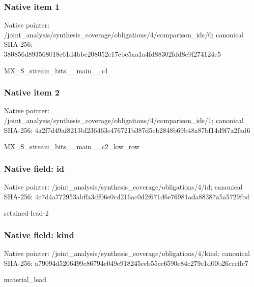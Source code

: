 \documentclass[10pt,a4paper]{article}
\begin{document}
\subsubsection{Native item 1}
Native pointer: /joint\_\allowbreak{}analysis/synthesis\_\allowbreak{}coverage/obligations/4/comparison\_\allowbreak{}ids/0; canonical SHA-256: 380856d893568018c61d4bbc208052c17ebe5aa1a4fd88302fdd8e9f274124c5

\begingroup\raggedright\sloppy MX\_\allowbreak{}S\_\allowbreak{}stream\_\allowbreak{}bits\_\allowbreak{}\_\allowbreak{}main\_\allowbreak{}\_\allowbreak{}c1\par\endgroup

\subsubsection{Native item 2}
Native pointer: /joint\_\allowbreak{}analysis/synthesis\_\allowbreak{}coverage/obligations/4/comparison\_\allowbreak{}ids/1; canonical SHA-256: 4a2f7d49af8213bf236463e476721b387d5cb2848b69b48a87bf14d9f7a2fad6

\begingroup\raggedright\sloppy MX\_\allowbreak{}S\_\allowbreak{}stream\_\allowbreak{}bits\_\allowbreak{}\_\allowbreak{}main\_\allowbreak{}\_\allowbreak{}c2\_\allowbreak{}low\_\allowbreak{}row\par\endgroup

\subsubsection{Native field: id}
Native pointer: /joint\_\allowbreak{}analysis/synthesis\_\allowbreak{}coverage/obligations/4/id; canonical SHA-256: 4c7d4a772953abffa3df06e0cd216ac0d2f671d6e76981ada88387a5a5729fbd

\begingroup\raggedright\sloppy retained-lead-2\par\endgroup

\subsubsection{Native field: kind}
Native pointer: /joint\_\allowbreak{}analysis/synthesis\_\allowbreak{}coverage/obligations/4/kind; canonical SHA-256: a79094d5206499c86794e049e918245ccb55ee6590e84c279e1d00b26cceffc7

\begingroup\raggedright\sloppy material\_\allowbreak{}lead\par\endgroup
\end{document}
